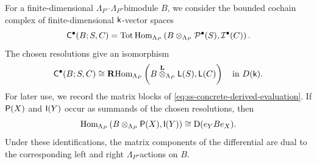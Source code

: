 For a finite-dimensional $\Lambda_P$--$\Lambda_P$-bimodule $B$, we
consider the bounded cochain complex of finite-dimensional
$\mathsf{k}$-vector spaces
\begin{equation}
\label{eq:ss-concrete-derived-evaluation}
\mathsf C^\bullet(B;S,C)
=
\operatorname{Tot}\operatorname{Hom}_{\Lambda_P}
\left(
B\otimes_{\Lambda_P}\mathcal P^\bullet(S),
\mathcal I^\bullet(C)
\right).
\end{equation}
The chosen resolutions give an isomorphism
\begin{equation}
\label{eq:ss-concrete-derived-evaluation-derived}
\mathsf C^\bullet(B;S,C)
\cong
\mathbf R\!\operatorname{Hom}_{\Lambda_P}
\left(
B\overset{\mathbf L}{\otimes}_{\Lambda_P}\mathsf L(S),
\mathsf L(C)
\right)
\quad\text{in }D(\mathsf{k}).
\end{equation}
For later use, we record the matrix blocks of
\eqref{eq:ss-concrete-derived-evaluation}.  If $\mathsf P(X)$ and
$\mathsf I(Y)$ occur as summands of the chosen resolutions, then
\begin{equation}
\label{eq:ss-bimodule-derived-evaluation-matrix-block}
\operatorname{Hom}_{\Lambda_P}
\left(
B\otimes_{\Lambda_P}\mathsf P(X),
\mathsf I(Y)
\right)
\cong
\mathrm D(e_YBe_X).
\end{equation}
Under these identifications, the matrix components of the
differential are dual to the corresponding left and right
$\Lambda_P$-actions on $B$.


